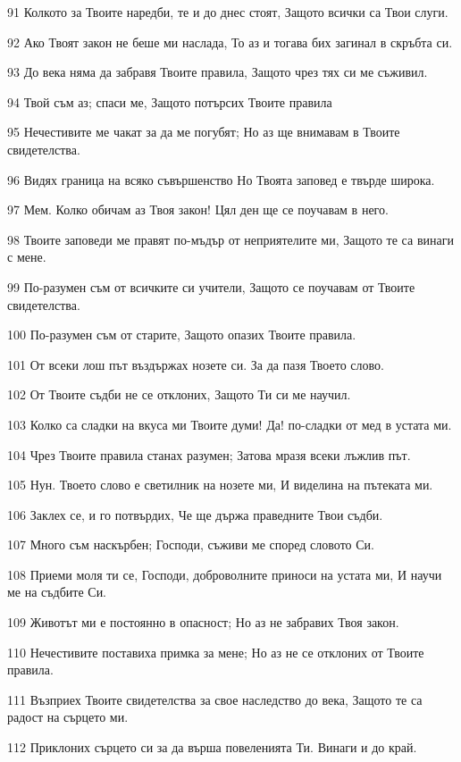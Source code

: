 \par 91 Колкото за Твоите наредби, те и до днес стоят, Защото всички са Твои слуги.
\par 92 Ако Твоят закон не беше ми наслада, То аз и тогава бих загинал в скръбта си.
\par 93 До века няма да забравя Твоите правила, Защото чрез тях си ме съживил.
\par 94 Твой съм аз; спаси ме, Защото потърсих Твоите правила
\par 95 Нечестивите ме чакат за да ме погубят; Но аз ще внимавам в Твоите свидетелства.
\par 96 Видях граница на всяко съвършенство Но Твоята заповед е твърде широка.
\par 97 Мем. Колко обичам аз Твоя закон! Цял ден ще се поучавам в него.
\par 98 Твоите заповеди ме правят по-мъдър от неприятелите ми, Защото те са винаги с мене.
\par 99 По-разумен съм от всичките си учители, Защото се поучавам от Твоите свидетелства.
\par 100 По-разумен съм от старите, Защото опазих Твоите правила.
\par 101 От всеки лош път въздържах нозете си. За да пазя Твоето слово.
\par 102 От Твоите съдби не се отклоних, Защото Ти си ме научил.
\par 103 Колко са сладки на вкуса ми Твоите думи! Да! по-сладки от мед в устата ми.
\par 104 Чрез Твоите правила станах разумен; Затова мразя всеки лъжлив път.
\par 105 Нун. Твоето слово е светилник на нозете ми, И виделина на пътеката ми.
\par 106 Заклех се, и го потвърдих, Че ще държа праведните Твои съдби.
\par 107 Много съм наскърбен; Господи, съживи ме според словото Си.
\par 108 Приеми моля ти се, Господи, доброволните приноси на устата ми, И научи ме на съдбите Си.
\par 109 Животът ми е постоянно в опасност; Но аз не забравих Твоя закон.
\par 110 Нечестивите поставиха примка за мене; Но аз не се отклоних от Твоите правила.
\par 111 Възприех Твоите свидетелства за свое наследство до века, Защото те са радост на сърцето ми.
\par 112 Приклоних сърцето си за да върша повеленията Ти. Винаги и до край.
